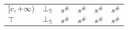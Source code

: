 \documentclass[aspectratio=169]{beamer}
\begin{document}
\begin{frame}
\begin{table}
{\begin{tabular}{|l|l|ll|ll|ll|l|}
        \multirow{3}{*}{$[c, +\infty)$} & \multirow{3}{*}{$\bot_\mathbb{S}$} & \multicolumn{2}{l|}{\multirow{3}{*}{$s^\#$}}                                       & \multicolumn{2}{l|}{\multirow{3}{*}{$s^\#$}}             & \multicolumn{2}{l|}{\multirow{3}{*}{$s^\#$}}                                       & \multirow{3}{*}{$s^\#$} \\
                                        &                         & \multicolumn{2}{l|}{}                                                              & \multicolumn{2}{l|}{}                                    & \multicolumn{2}{l|}{}                                                              &                         \\
                                        &                         & \multicolumn{2}{l|}{}                                                              & \multicolumn{2}{l|}{}                                    & \multicolumn{2}{l|}{}                                                              &                         \\ \hline
        $\top$                          & $\bot_\mathbb{S}$                  & \multicolumn{2}{l|}{$s^\#$}                                                        & \multicolumn{2}{l|}{$s^\#$}                              & \multicolumn{2}{l|}{$s^\#$}                                                        & $s^\#$                  \\ \hline
        \end{tabular}
        }
        \end{table}
    \end{frame}
    
\end{document}
